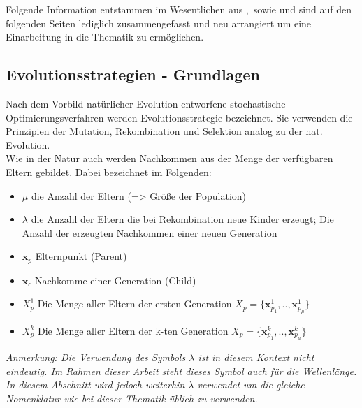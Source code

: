 \label{seq:EvolutionaryStrategies}
Folgende Information entstammen im Wesentlichen aus \cite{kost2003optimierung},\cite{bronstejn2012taschenbuch}\ sowie \cite{Hansen:1} und sind auf den folgenden Seiten lediglich zusammengefasst und neu arrangiert um eine Einarbeitung in die Thematik zu ermöglichen.\\
\subsection{Evolutionsstrategien - Grundlagen }
%
Nach dem Vorbild natürlicher Evolution entworfene stochastische Optimierungsverfahren werden Evolutionsstrategie bezeichnet. Sie verwenden die Prinzipien der Mutation, Rekombination und Selektion analog zu der nat. Evolution.\\
Wie in der Natur auch werden Nachkommen aus der Menge der verfügbaren Eltern gebildet. Dabei bezeichnet im Folgenden:
\begin{itemize}
\item $\mu$ die Anzahl der Eltern (=> Größe der Population)
\item $\lambda$ die Anzahl der Eltern die bei Rekombination neue Kinder erzeugt; Die Anzahl der erzeugten Nachkommen einer neuen Generation
\item $\mathbf{x}_p$ Elternpunkt (Parent)
\item $\mathbf{x}_c$ Nachkomme einer Generation (Child)
\item $X_p^1$ Die Menge aller Eltern der ersten Generation $X_p = \{\mathbf{x}_{p_1}^1,..,\mathbf{x}_{p_\mu}^1\}$
\item $X_p^k$ Die Menge aller Eltern der k-ten Generation $X_p = \{\mathbf{x}_{p_1}^k,..,\mathbf{x}_{p_\mu}^k\}$
\end{itemize}
\textit{Anmerkung: Die Verwendung des Symbols $\lambda$ ist in diesem Kontext nicht eindeutig. Im Rahmen dieser Arbeit steht dieses Symbol auch für die Wellenlänge. In diesem Abschnitt wird jedoch weiterhin $\lambda$ verwendet um die gleiche Nomenklatur wie bei dieser Thematik üblich zu verwenden.}
%
